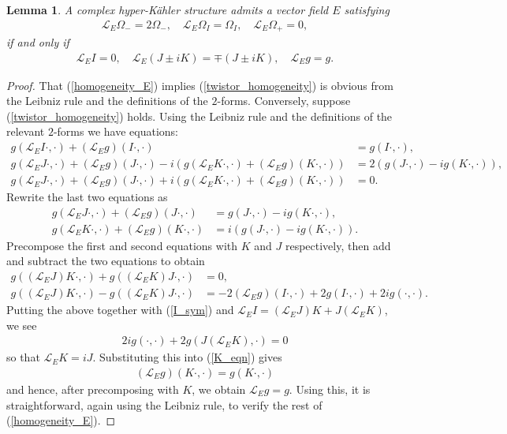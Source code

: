 \documentclass[a4paper,12pt,reqno]{amsart}
\newcounter{counter2}
\numberwithin{equation}{section}
\numberwithin{counter2}{section}
\newcounter{counter3}
\newtheorem{lemma}[counter2]{Lemma}
\begin{document}
\begin{lemma}\label{homogeneity_lemma}
A complex hyper-K\"ahler structure admits a vector field $E$ satisfying 
\begin{align}\label{twistor_homogeneity}
\mathcal{L}_E\Omega_{-} = 2\Omega_{-},  \quad \mathcal{L}_E\Omega_{I} = \Omega_{I},  \quad \mathcal{L}_E\Omega_{+} = 0,  
\end{align}
if and only if 
\begin{align}\label{homogeneity_E}
\mathcal{L}_EI = 0,  \quad \mathcal{L}_{E}(J \pm iK) = \mp(J \pm iK),  \quad \mathcal{L}_Eg = g.  
\end{align}
\end{lemma}
\begin{proof}
That (\ref{homogeneity_E}) implies (\ref{twistor_homogeneity}) is obvious from the Leibniz rule and the definitions of the $2$-forms.  Conversely,  suppose (\ref{twistor_homogeneity}) holds.  
Using the Leibniz rule and the definitions of the relevant $2$-forms we have equations:
\begin{align}
g(\mathcal{L}_EI\cdot,\cdot) + (\mathcal{L}_Eg)(I\cdot,\cdot) &= g(I\cdot,\cdot),  \label{I_sym} \\ 
g(\mathcal{L}_EJ\cdot, \cdot) + (\mathcal{L}_Eg)(J\cdot,\cdot) - i(g(\mathcal{L}_EK\cdot,\cdot) + (\mathcal{L}_Eg)(K\cdot,\cdot)) &= 2(g(J\cdot,\cdot)-ig(K\cdot,\cdot)), \\
g(\mathcal{L}_EJ\cdot, \cdot) + (\mathcal{L}_Eg)(J\cdot,\cdot) + i(g(\mathcal{L}_EK\cdot,\cdot) + (\mathcal{L}_Eg)(K\cdot,\cdot)) &= 0. 
\end{align}
Rewrite the last two equations as
\begin{align}
g(\mathcal{L}_EJ\cdot,\cdot) + (\mathcal{L}_Eg)(J\cdot,\cdot) &= g(J\cdot,\cdot) - ig(K\cdot,\cdot),  \\
g(\mathcal{L}_EK\cdot,\cdot) + (\mathcal{L}_Eg)(K\cdot,\cdot) &= i(g(J\cdot,\cdot) - ig(K\cdot,\cdot)).  \label{K_eqn}
\end{align}
Precompose the first and second equations with $K$ and $J$ respectively,  then add and subtract the two equations to obtain
\begin{align}
g((\mathcal{L}_EJ)K\cdot,\cdot) + g((\mathcal{L}_EK)J\cdot,\cdot) &= 0,  \\
g((\mathcal{L}_EJ)K\cdot,\cdot) - g((\mathcal{L}_EK)J\cdot,\cdot) &= -2(\mathcal{L}_Eg)(I\cdot,\cdot) + 2g(I\cdot,\cdot) + 2ig(\cdot,\cdot).
\end{align}
Putting the above together with (\ref{I_sym}) and $\mathcal{L}_EI = (\mathcal{L}_EJ)K + J(\mathcal{L}_EK)$,  we see
\begin{align}
2ig(\cdot,\cdot) + 2g(J(\mathcal{L}_EK),\cdot) = 0
\end{align}
so that $\mathcal{L}_EK = iJ$.  Substituting this into (\ref{K_eqn}) gives
\begin{align}
(\mathcal{L}_Eg)(K\cdot,\cdot) = g(K\cdot,\cdot)
\end{align}
and hence,  after precomposing with $K$,  we obtain $\mathcal{L}_Eg = g$.  
Using this,  it is straightforward,  again using the Leibniz rule,  to verify the rest of (\ref{homogeneity_E}). 
\end{proof}
\end{document}
